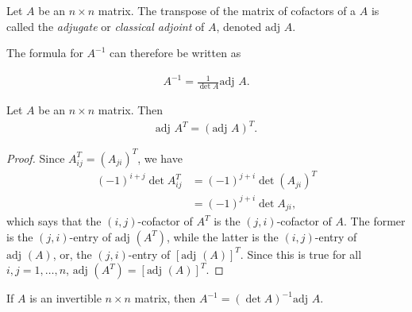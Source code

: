 \documentclass[12pt,letterpaper,reqno]{article}
\numberwithin{equation}{section}
\begin{document}
\begin{defn}
	Let $A$ be an $n \times n$ matrix. The transpose of the matrix of cofactors of a $A$ is called the \emph{adjugate} or \emph{classical adjoint} of $A$, denoted $\text{adj }A$.
\end{defn}

The formula for $A^{-1}$ can therefore be written as 

\begin{align*}
	A^{-1}=\frac{1}{\det A}\text{adj }A.
\end{align*}

\begin{lem}\label{lem:transpose_of_adj_transpose}
	Let $A$ be an $n \times n$ matrix. Then
	\begin{align*}
		\text{adj }A^T=(\text{adj }A)^T.
	\end{align*}
\end{lem}

\begin{proof}
	Since $A_{ij}^T=(A_{ji})^T$, we have
	\begin{align*}
		(-1)^{i+j}\det A_{ij}^T&=(-1)^{j+i}\det (A_{ji})^T \\
		&=(-1)^{j+i}\det A_{ji},
	\end{align*}
	which says that the $(i,j)$-cofactor of $A^T$ is the $(j,i)$-cofactor of $A$. The former is the $(j,i)$-entry of $\text{adj }(A^T)$, while the latter is the $(i,j)$-entry of $\text{adj }(A)$, or, the $(j,i)$-entry of $[\text{adj }(A)]^T$. Since this is true for all $i,j=1,\dots,n$, $\text{adj }(A^T)=[\text{adj }(A)]^T$.
\end{proof}


\begin{thm}\label{thm:formula_for_a_inverse}
	If $A$ is an invertible $n \times n$ matrix, then $A^{-1}=(\det A)^{-1}\text{adj }A$.
\end{thm}
\end{document}
